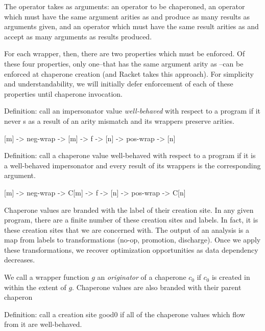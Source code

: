 \documentclass{sigplanconf}
\begin{document}
The  operator takes as arguments: an operator  to be chaperoned, an operator  which must have the same argument arities as  and produce as many results as arguments given, and an operator  which must have the same result arities as  and accept as many arguments as results produced.

For each wrapper, then, there are two properties which must be enforced.
Of these four properties, only one--that  has the same argument arity as --can be enforced at chaperone creation (and Racket takes this approach). For simplicity and understandability, we will initially defer enforcement of each of these properties until chaperone invocation.

Definition: call an impersonator value \emph{well-behaved} with respect to a program if it never s as a result of an arity mismatch and its wrappers preserve arities.

[m] -> neg-wrap -> [m] -> f -> [n] -> pos-wrap -> [n]

Definition: call a chaperone value well-behaved with respect to a program if it is a well-behaved impersonator and every result of its wrappers is  the corresponding argument.


[m] -> neg-wrap -> C[m] -> f -> [n] -> pos-wrap -> C[n]

Chaperone values are branded with the label of their creation site. In any given program, there are a finite number of these creation sites and labels. In fact, it is these creation sites that we are concerned with. The output of an analysis is a map from labels to transformations (no-op, promotion, discharge). Once we apply these transformations, we recover optimization opportunities as data dependency decreases.

We call a wrapper function $g$ an \emph{originator} of a chaperone $c_0$ if $c_0$ is created in within the extent of $g$. Chaperone values are also branded with their parent chaperon

Definition: call a creation site good0 if all of the chaperone values which flow from it are well-behaved.
\end{document}
